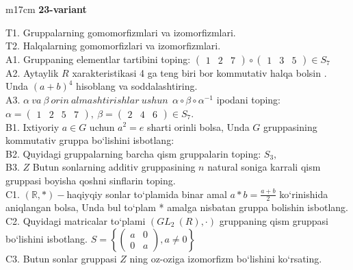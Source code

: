 \documentclass{article}
\begin{document}
\begin{tabular}{m{17cm}}
\textbf{23-variant}
\newline

T1. Gruppalarning gomomorfizmlari va izomorfizmlari. \\
T2. Halqalarning gomomorfizlari va izomorfizmlari. \\
A1. Gruppaning elementlar tartibini toping: \(\begin{pmatrix}
1 & 2 & 7
\end{pmatrix} \circ \begin{pmatrix}
1 & 3 & 5
\end{pmatrix} \in S_{7}\) \\
A2. Aytaylik \(R\) xarakteristikasi 4 ga teng biri bor kommutativ halqa bo\textquotesingle lsin . Unda \((a + b)^{4}\) hisoblang va soddalashtiring. \\
A3. \(\alpha\ va\ \beta\ orin\ almashtirishlar\ ushun\ \ \alpha \circ \beta \circ \alpha^{- 1}\) ipodani toping:\(\alpha = \begin{pmatrix}
1 & 2 & 5 & 7
\end{pmatrix},\ \beta = \begin{pmatrix}
2 & 4 & 6
\end{pmatrix} \in S_{7}\). \\
B1. Ixtiyoriy \(a \in G\) uchun \(a^{2} = e\) sharti orinli bolsa, Unda \(G\) gruppasining kommutativ gruppa bo`lishini isbotlang: \\
B2. Quyidagi gruppalarning barcha qism gruppalarin toping: \(S_{3},\) \\
B3. \(Z\) Butun sonlarning additiv gruppasining \(n\) natural soniga karrali qism gruppasi boyisha qo\textquotesingle shni sinflarin toping. \\
C1. \((\mathbb{R},*) -\)haqiyqiy sonlar to`plamida binar amal \(a*b = \frac{a + b}{2}\) ko`rinishida aniqlangan bolsa, Unda bul to`plam * amalga nisbatan gruppa bolishin isbotlang. \\
C2. Quyidagi matricalar to`plami \((GL_{2}^{\ }\ (R), \cdot )\) gruppaning qism gruppasi bo`lishini isbotlang. \(S = \left\{ \begin{pmatrix}
a & 0 \\
0 & a
\end{pmatrix},a \neq 0 \right\}\) \\
C3. Butun sonlar gruppasi \(Z\) ning o\textquotesingle z-o\textquotesingle ziga izomorfizm bo`lishini ko`rsating. \\

\end{tabular}
\vspace{1cm}
\end{document}
